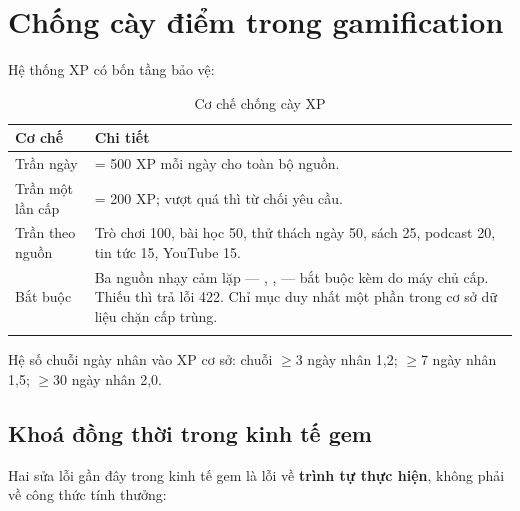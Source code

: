 \section{Chống cày điểm trong gamification}

Hệ thống XP có bốn tầng bảo vệ:

\begin{longtable}{L{4.6cm} L{9.0cm}}
\toprule
\textbf{Cơ chế} & \textbf{Chi tiết}\\
\midrule
\endhead
Trần ngày &  = 500 XP mỗi ngày cho toàn bộ nguồn.\\
Trần một lần cấp &  = 200 XP; vượt quá thì từ chối yêu cầu.\\
Trần theo nguồn & Trò chơi 100, bài học 50, thử thách ngày 50, sách 25, podcast 20, tin tức 15, YouTube 15.\\
Bắt buộc  & Ba nguồn nhạy cảm lặp — , ,  — bắt buộc kèm  do máy chủ cấp. Thiếu thì trả lỗi 422. Chỉ mục duy nhất một phần trong cơ sở dữ liệu chặn cấp trùng.\\
\bottomrule
\caption{Cơ chế chống cày XP}
\end{longtable}

Hệ số chuỗi ngày nhân vào XP cơ sở: chuỗi \(\ge\)3 ngày nhân 1,2; \(\ge\)7 ngày nhân 1,5;
\(\ge\)30 ngày nhân 2,0.

\subsection{Khoá đồng thời trong kinh tế gem}

Hai sửa lỗi gần đây trong kinh tế gem là lỗi về \textbf{trình tự thực hiện}, không phải
về công thức tính thưởng:

